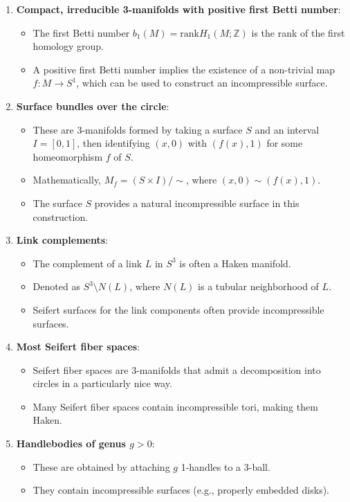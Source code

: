 \documentclass{article}
\begin{document}
\begin{enumerate}
  \item \textbf{Compact, irreducible 3-manifolds with positive first Betti number}:
  \begin{itemize}
    \item The first Betti number $b_1(M) = \text{rank} H_1(M; \mathbb{Z})$ is the rank of the first homology group.
    \item A positive first Betti number implies the existence of a non-trivial map $f : M \to S^1$, which can be used to construct an incompressible surface.
  \end{itemize}
  
  \item \textbf{Surface bundles over the circle}:
  \begin{itemize}
    \item These are 3-manifolds formed by taking a surface $S$ and an interval $I=[0,1]$, then identifying $(x,0)$ with $(f(x),1)$ for some homeomorphism $f$ of $S$.
    \item Mathematically, $M_f = (S \times I) / \sim$, where $(x,0) \sim (f(x),1)$.
    \item The surface $S$ provides a natural incompressible surface in this construction.
  \end{itemize}
  
  \item \textbf{Link complements}:
  \begin{itemize}
    \item The complement of a link $L$ in $S^3$ is often a Haken manifold.
    \item Denoted as $S^3 \setminus N(L)$, where $N(L)$ is a tubular neighborhood of $L$.
    \item Seifert surfaces for the link components often provide incompressible surfaces.
  \end{itemize}
  
  \item \textbf{Most Seifert fiber spaces}:
  \begin{itemize}
    \item Seifert fiber spaces are 3-manifolds that admit a decomposition into circles in a particularly nice way.
    \item Many Seifert fiber spaces contain incompressible tori, making them Haken.
  \end{itemize}
  
  \item \textbf{Handlebodies of genus $g > 0$}:
  \begin{itemize}
    \item These are obtained by attaching $g$ 1-handles to a 3-ball.
    \item They contain incompressible surfaces (e.g., properly embedded disks).
  \end{itemize}
\end{enumerate}
\end{document}
